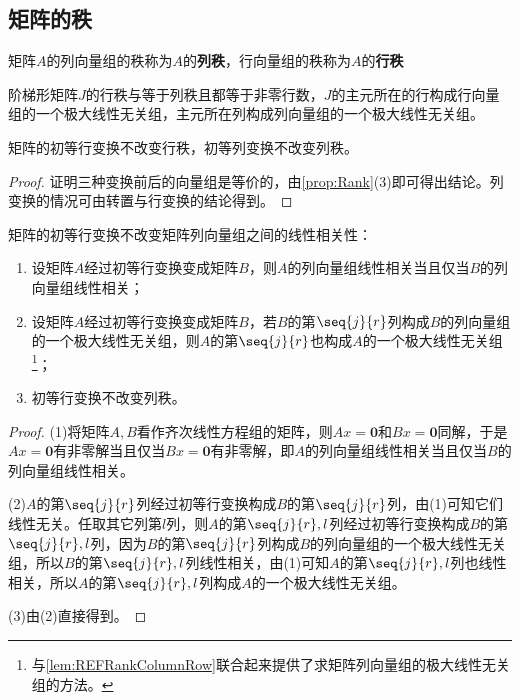 \subsection{矩阵的秩}
\begin{definition}
	矩阵$A$的列向量组的秩称为$A$的\textbf{列秩}，行向量组的秩称为$A$的\textbf{行秩}
\end{definition}
\begin{lemma}\label{lem:REFRankColumnRow}
	阶梯形矩阵$J$的行秩与等于列秩且都等于非零行数，$J$的主元所在的行构成行向量组的一个极大线性无关组，主元所在列构成列向量组的一个极大线性无关组。
\end{lemma}
\begin{lemma}\label{lem:ElementaryRowColumnTransRank}
	矩阵的初等行变换不改变行秩，初等列变换不改变列秩。
\end{lemma}
\begin{proof}
	证明三种变换前后的向量组是等价的，由\cref{prop:Rank}(3)即可得出结论。列变换的情况可由转置与行变换的结论得到。
\end{proof}
\begin{lemma}\label{lem:ElementaryRowSameColumn}
	矩阵的初等行变换不改变矩阵列向量组之间的线性相关性：
	\begin{enumerate}
		\item 设矩阵$A$经过初等行变换变成矩阵$B$，则$A$的列向量组线性相关当且仅当$B$的列向量组线性相关；
		\item 设矩阵$A$经过初等行变换变成矩阵$B$，若$B$的第$\seq{j}{r}$列构成$B$的列向量组的一个极大线性无关组，则$A$的第$\seq{j}{r}$也构成$A$的一个极大线性无关组\footnote{与\cref{lem:REFRankColumnRow}联合起来提供了求矩阵列向量组的极大线性无关组的方法。}；
		\item 初等行变换不改变列秩。
	\end{enumerate}
\end{lemma}
\begin{proof}
	(1)将矩阵$A,B$看作齐次线性方程组的矩阵，则$Ax=\mathbf{0}$和$Bx=\mathbf{0}$同解，于是$Ax=\mathbf{0}$有非零解当且仅当$Bx=\mathbf{0}$有非零解，即$A$的列向量组线性相关当且仅当$B$的列向量组线性相关。\par
	(2)$A$的第$\seq{j}{r}$列经过初等行变换构成$B$的第$\seq{j}{r}$列，由(1)可知它们线性无关。任取其它列第$l$列，则$A$的第$\seq{j}{r},l$列经过初等行变换构成$B$的第$\seq{j}{r},l$列，因为$B$的第$\seq{j}{r}$列构成$B$的列向量组的一个极大线性无关组，所以$B$的第$\seq{j}{r},l$列线性相关，由(1)可知$A$的第$\seq{j}{r},l$列也线性相关，所以$A$的第$\seq{j}{r},l$列构成$A$的一个极大线性无关组。\par
	(3)由(2)直接得到。
\end{proof}
